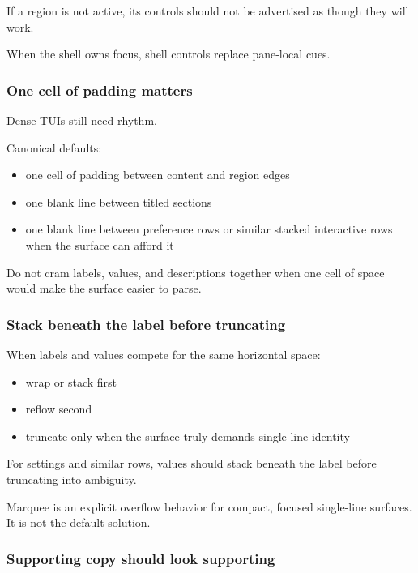 If a region is not active, its controls should not be advertised as though they will work.

When the shell owns focus, shell controls replace pane-local cues.

\subsubsection{One cell of padding matters}\label{record-023-one-cell-of-padding-matters}

Dense TUIs still need rhythm.

Canonical defaults:

\begin{itemize}
\tightlist
\item
  one cell of padding between content and region edges
\item
  one blank line between titled sections
\item
  one blank line between preference rows or similar stacked interactive rows when the surface can afford it
\end{itemize}

Do not cram labels, values, and descriptions together when one cell of space would make the surface easier to parse.

\subsubsection{Stack beneath the label before truncating}\label{record-023-stack-beneath-the-label-before-truncating}

When labels and values compete for the same horizontal space:

\begin{itemize}
\tightlist
\item
  wrap or stack first
\item
  reflow second
\item
  truncate only when the surface truly demands single-line identity
\end{itemize}

For settings and similar rows, values should stack beneath the label before truncating into ambiguity.

Marquee is an explicit overflow behavior for compact, focused single-line surfaces. It is not the default solution.

\subsubsection{Supporting copy should look supporting}\label{record-023-supporting-copy-should-look-supporting}

